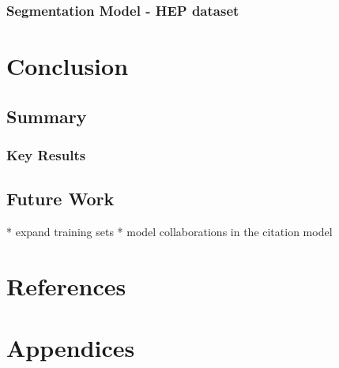 \documentclass[10pt, oneside]{scrartcl}   	%
\begin{document}
\subsubsection{Segmentation Model - HEP dataset}
\section{Conclusion}
\subsection{Summary}
\subsubsection{Key Results}
\subsection{Future Work}
* expand training sets
* model collaborations in the citation model
\section{References}
\section{Appendices}






\end{document}
